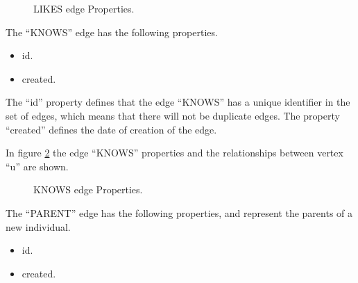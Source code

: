 \begin{figure}
\captionsetup{justification=centering,margin=2cm}
\centering
\setlength\fboxsep{0pt}
\setlength\fboxrule{0.7pt}
\caption{LIKES edge Properties.}
\label{fig:Likes_edge}       
\end{figure}

The “KNOWS” edge has the following properties.
\begin{itemize} 
\item id. 
\item created. 
\end{itemize}

The “id” property defines that the edge “KNOWS” has a unique identifier in the
set of edges, which means that there will not be duplicate edges. The property
“created” defines the date of creation of the edge.

In figure \ref{fig:Knows_edge} the edge “KNOWS” properties and the relationships between vertex “u”
are shown.

\begin{figure}
\captionsetup{justification=centering,margin=2cm}
\centering
\setlength\fboxsep{0pt}
\setlength\fboxrule{0.7pt}
\caption{KNOWS edge Properties.}
\label{fig:Knows_edge}       
\end{figure}

The “PARENT” edge has the following properties, and represent the parents of a new individual.
\begin{itemize} 
\item id. 
\item created. 
\end{itemize}

